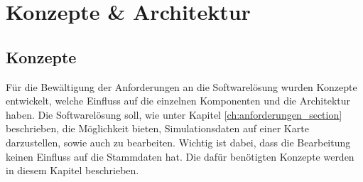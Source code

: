 \chapter{Konzepte \& Architektur}
\label{ch:konzepte_architektur}
\section{Konzepte}
Für die Bewältigung der Anforderungen an die Softwarelösung wurden Konzepte entwickelt, welche Einfluss auf die einzelnen Komponenten und die Architektur haben. Die Softwarelösung soll, wie unter Kapitel \ref{ch:anforderungen_section}  beschrieben,  die Möglichkeit bieten, Simulationsdaten auf einer Karte darzustellen, sowie auch zu bearbeiten. Wichtig ist dabei, dass die Bearbeitung keinen Einfluss auf die Stammdaten hat. Die dafür benötigten Konzepte werden in diesem Kapitel beschrieben.
